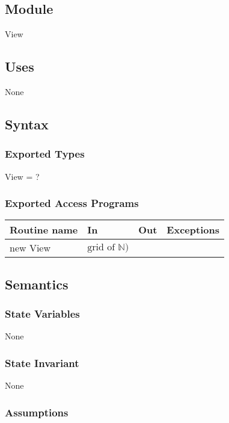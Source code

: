 \documentclass[12pt]{article}
\begin{document}
\subsection* {Module}

View

\subsection* {Uses}

None

\subsection* {Syntax}

\subsubsection* {Exported Types}

View = ?

\subsubsection* {Exported Access Programs}

\begin{tabular}{| l | l | l | l |}
\hline
\textbf{Routine name} & \textbf{In} & \textbf{Out} & \textbf{Exceptions}\\
\hline
new View & $\text{grid of } \mathbb{N})$ & & \\
\hline

\end{tabular}

\subsection* {Semantics}

\subsubsection* {State Variables}

None

\subsubsection* {State Invariant}

None

\subsubsection* {Assumptions}
\end{document}
